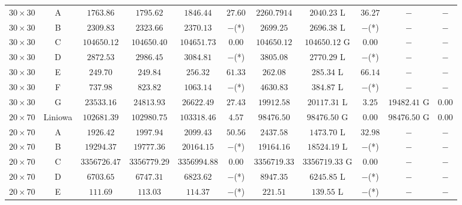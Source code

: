 \begin{table}[H]
\begin{center}
{\begin{tabular}{c|c||c|c|c|c||c||c|c||c|c}
            $30 \times 30$ & A             & $1763.86$ & $1795.62$ & $1846.44$ & $27.60$        & $2260.7914$   & $2040.23$ L & $36.27$           & $-$ & $-$ \\
            $30 \times 30$ & B             & $2309.83$ & $2323.66$ & $2370.13$ & $-$(*)         & $2699.25$     & $2696.38$ L & $-$(*)            & $-$ & $-$ \\
            $30 \times 30$ & C             & $104650.12$ & $104650.40$ & $104651.73$ & $0.00$   & $104650.12$   & $104650.12$ G & $0.00$          & $-$ & $-$ \\
            $30 \times 30$ & D             & $2872.53$ & $2986.45$ & $3084.81$ & $-$(*)         & $3805.08$     & $2770.29$ L & $-$(*)            & $-$ & $-$ \\
            $30 \times 30$ & E             & $249.70$ & $249.84$ & $256.32$ & $61.33$           & $262.08$      & $285.34$ L & $66.14$            & $-$ & $-$ \\
            $30 \times 30$ & F             & $737.98$ & $823.82$ & $1063.14$ & $-$(*)           & $4630.83$     & $384.87$ L & $-$(*)             & $-$ & $-$ \\
            $30 \times 30$ & G             & $23533.16$ & $24813.93$ & $26622.49$ & $27.43$     & $19912.58$    & $20117.31$ L & $3.25$           & $19482.41$ G & $0.00$ \\
            \hline  
            $20 \times 70$ & Liniowa       & $102681.39$ & $102980.75$ & $103318.46$ & $4.57$   & $98476.50$    & $98476.50$ G & $0.00$           & $98476.50$ G & $0.00$ \\
            $20 \times 70$ & A             & $1926.42$ & $1997.94$ & $2099.43$ & $50.56$        & $2437.58$     & $1473.70$ L & $32.98$           & $-$ & $-$ \\
            $20 \times 70$ & B             & $19294.37$ & $19777.36$ & $20164.15$ & $-$(*)      & $19164.16$    & $18524.19$ L & $-$(*)           & $-$ & $-$ \\
            $20 \times 70$ & C             & $3356726.47$ & $3356779.29$ & $3356994.88$ & $0.00$& $3356719.33$  & $3356719.33$ G & $0.00$         & $-$ & $-$ \\
            $20 \times 70$ & D             & $6703.65$ & $6747.31$ & $6823.62$ & $-$(*)         & $8947.35$     & $6245.85$ L & $-$(*)            & $-$ & $-$ \\
            $20 \times 70$ & E             & $111.69$ & $113.03$ & $114.37$ & $-$(*)            & $221.51$      & $139.55$ L & $-$(*)             & $-$ & $-$ \\

\end{tabular}}
\end{center}
\end{table}
